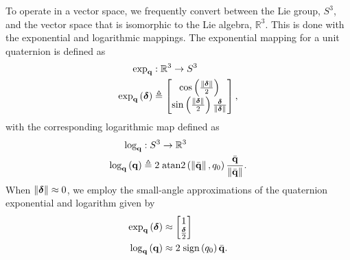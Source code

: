 To operate in a vector space, we frequently convert between the Lie group,
$S^3$,
and the vector space that is isomorphic to the Lie algebra, $\mathbb{R}^3$.
This is done with the
exponential and logarithmic mappings. The exponential mapping for a unit quaternion is defined as
\begin{align}
\exp_{\boldsymbol{\mathrm{q}}} & :\mathbb{R}^{3}\rightarrow S^3\nonumber \\
\exp_{\boldsymbol{\mathrm{q}}}\left(\boldsymbol{\mathrm{\delta}}\right) & \triangleq\begin{bmatrix}\cos\left(\frac{\lVert\boldsymbol{\mathrm{\delta}}\rVert}{2}\right)\\
\sin\left(\frac{\lVert\boldsymbol{\mathrm{\delta}}\rVert}{2}\right)\frac{\boldsymbol{\mathrm{\delta}}}{\lVert\boldsymbol{\mathrm{\delta}}\rVert}
\end{bmatrix},\label{eqn:exponential_map}
\end{align}
with the corresponding logarithmic map defined as
\begin{align}
\log_{\boldsymbol{\mathrm{q}}} & :S^3\rightarrow \mathbb{R}^{3}\nonumber \\
\log_{\boldsymbol{\mathrm{q}}}\left(\boldsymbol{\mathrm{q}}\right) & \triangleq2\;\mathrm{atan2}\left(\left\Vert \bar{\boldsymbol{\mathrm{q}}}\right\Vert ,q_{0}\right)\frac{\bar{\boldsymbol{\mathrm{q}}}}{\left\Vert \bar{\boldsymbol{\mathrm{q}}}\right\Vert }.\label{eqn:log_map}
\end{align}
When $\left\Vert \boldsymbol{\mathrm{\delta}}\right\Vert\approx0$,
we employ the small-angle approximations of the quaternion exponential and
logarithm given by
\begin{align}
\exp_{\boldsymbol{\mathrm{q}}}\left(\boldsymbol{\mathrm{\delta}}\right) & \approx\begin{bmatrix}1\\
\frac{\boldsymbol{\mathrm{\delta}}}{2}
\end{bmatrix}\label{eq:est_paper_quaternion_exp_approx}\\
\log_{\boldsymbol{\mathrm{q}}}\left(\boldsymbol{\mathrm{q}}\right) & \approx2\;\textrm{sign}\left(q_{0}\right)\bar{\boldsymbol{\mathrm{q}}}.\label{eq:quaternion_log_approx}
\end{align}


